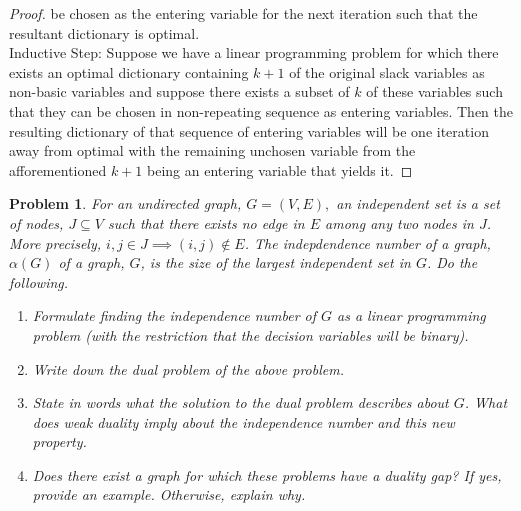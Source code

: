 \documentclass[12pt,oneside]{amsart}
\numberwithin{equation}{section}
\numberwithin{figure}{section}
\theoremstyle{plain}
\newtheorem{prob}{Problem}
\theoremstyle{definition}
\begin{document}
\begin{proof}
  be chosen as the entering variable for the next iteration such that the 
  resultant dictionary is optimal. \\
  Inductive Step: Suppose we have a linear programming problem for which there 
  exists an optimal dictionary containing $k+1$ of the original slack variables 
  as non-basic variables and suppose there exists a subset of $k$ of these 
  variables such that they can be chosen in non-repeating sequence as entering 
  variables. Then the resulting dictionary of that sequence of entering variables 
  will be one iteration away from optimal with the remaining unchosen variable 
  from the afforementioned $k+1$ being an entering variable that yields it.
\end{proof}

\begin{prob}
For an undirected graph, $G = (V,E),$ an independent set is a set of nodes, $J 
\subseteq V$ such that there exists no edge in $E$ among any two nodes in $J$. 
More precisely, $i,j \in J \implies (i,j) \not \in E$. The indepdendence number 
of a graph, $\alpha(G)$ of a graph, $G$, is the size of the largest independent 
set in $G$. Do the following. \\
\begin{enumerate}
  \item Formulate finding the independence number of $G$ as a linear programming 
    problem (with the restriction that the decision variables will be binary). \\
  \item Write down the dual problem of the above problem. \\
  \item State in words what the solution to the dual problem describes about $G$. 
    What does weak duality imply about the independence number and this new 
    property. \\
  \item Does there exist a graph for which these problems have a duality gap? If 
    yes, provide an example. Otherwise, explain why.
\end{enumerate}
\end{prob}
\end{document}
